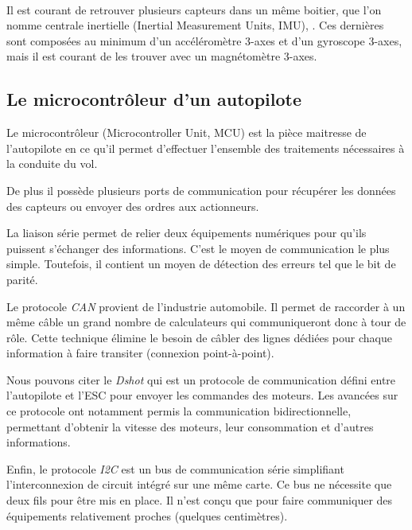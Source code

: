 \paragraph*{}
 Il est courant de retrouver plusieurs capteurs dans un même boitier, que l'on nomme centrale inertielle (Inertial Measurement Units, IMU), . Ces dernières sont composées au minimum d'un accéléromètre 3-axes et d'un gyroscope 3-axes, mais il est courant de les trouver avec un magnétomètre 3-axes. 

 \subsection*{Le microcontrôleur d'un autopilote}
 \label{sec:micoctrl}
 Le microcontrôleur (Microcontroller Unit, MCU)  est la pièce maitresse de l'autopilote en ce qu'il permet d'effectuer l'ensemble des traitements nécessaires à la conduite du vol.

 De plus il possède plusieurs ports de communication pour récupérer les données des capteurs ou envoyer des ordres aux actionneurs.



La liaison série permet de relier deux équipements numériques pour qu'ils puissent s'échanger des informations. C'est le moyen de communication le plus simple. Toutefois, il contient un moyen de détection des erreurs tel que le bit de parité.

 Le protocole \textit{CAN} provient de l'industrie automobile. Il permet de raccorder à un même câble un grand nombre de calculateurs qui communiqueront donc à tour de rôle. Cette technique élimine le besoin de câbler des lignes dédiées pour chaque information à faire transiter (connexion point-à-point).

 Nous pouvons citer le \textit{Dshot} qui est un protocole de communication défini entre l'autopilote et l'ESC pour envoyer les commandes des moteurs. Les avancées sur ce protocole ont notamment permis la communication bidirectionnelle, permettant d'obtenir la vitesse des moteurs, leur consommation et d'autres informations.

 Enfin, le protocole \textit{I2C} est un bus de communication série simplifiant l'interconnexion de circuit intégré sur une même carte. Ce bus ne nécessite que deux fils pour être mis en place. Il n'est conçu que pour faire communiquer des équipements relativement proches (quelques centimètres).

